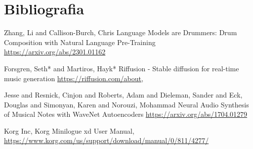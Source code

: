 \documentclass[]{beamer}
\begin{document}
\section{Bibliografia}

\begin{frame}
  \begin{thebibliography}{99} %

   Zhang, Li and Callison-Burch, Chris
  \newblock Language Models are Drummers: Drum Composition with Natural Language Pre-Training
  \newblock \url{https://arxiv.org/abs/2301.01162}

   Forsgren, Seth* and Martiros, Hayk*
  \newblock Riffusion - Stable diffusion for real-time music generation
  \newblock \url{https://riffusion.com/about},

   Jesse and Resnick, Cinjon and Roberts, Adam and Dieleman, Sander and Eck, Douglas and Simonyan, Karen and Norouzi, Mohammad
  \newblock Neural Audio Synthesis of Musical Notes with WaveNet Autoencoders
  \newblock \url{https://arxiv.org/abs/1704.01279}

   Korg Inc,
  \newblock Korg Minilogue xd User Manual,
  \newblock \url{https://www.korg.com/us/support/download/manual/0/811/4277/}

  \end{thebibliography}
\end{frame}


\end{document}

